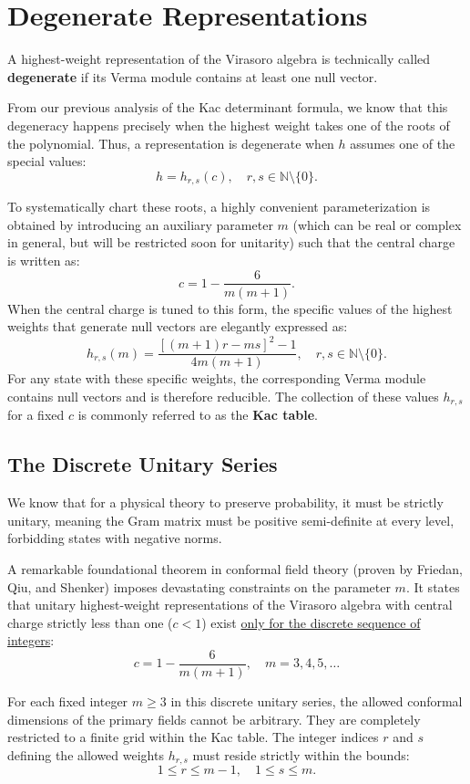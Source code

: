\section{Degenerate Representations}

A highest-weight representation of the Virasoro algebra is technically called \textbf{degenerate} if its Verma module contains at least one null vector.

From our previous analysis of the Kac determinant formula, we know that this degeneracy happens precisely when the highest weight takes one of the roots of the polynomial. Thus, a representation is degenerate when \(h\) assumes one of the special values:
\[
    h = h_{r,s}(c), \quad r, s \in \mathbb{N} \setminus \{0\}.
\]

To systematically chart these roots, a highly convenient parameterization is obtained by introducing an auxiliary parameter \(m\) (which can be real or complex in general, but will be restricted soon for unitarity) such that the central charge is written as:
\[
    c = 1 - \frac{6}{m(m+1)}.
\]
When the central charge is tuned to this form, the specific values of the highest weights that generate null vectors are elegantly expressed as:
\[
    h_{r,s}(m) = \frac{[(m+1)r - ms]^2 - 1}{4m(m+1)}, \quad r, s \in \mathbb{N} \setminus \{0\}.
\]
For any state with these specific weights, the corresponding Verma module contains null vectors and is therefore reducible. The collection of these values \(h_{r,s}\) for a fixed \(c\) is commonly referred to as the \textbf{Kac table}.

\subsection{The Discrete Unitary Series}

We know that for a physical theory to preserve probability, it must be strictly unitary, meaning the Gram matrix must be positive semi-definite at every level, forbidding states with negative norms.

A remarkable foundational theorem in conformal field theory (proven by Friedan, Qiu, and Shenker) imposes devastating constraints on the parameter \(m\). It states that unitary highest-weight representations of the Virasoro algebra with central charge strictly less than one (\(c < 1\)) exist \uline{only for the discrete sequence of integers}:
\[
    c = 1 - \frac{6}{m(m+1)}, \quad m = 3, 4, 5, \dots
\]

For each fixed integer \(m \ge 3\) in this discrete unitary series, the allowed conformal dimensions of the primary fields cannot be arbitrary. They are completely restricted to a finite grid within the Kac table. The integer indices \(r\) and \(s\) defining the allowed weights \(h_{r,s}\) must reside strictly within the bounds:
\[
    1 \leq r \leq m-1, \quad 1 \leq s \leq m.
\]

